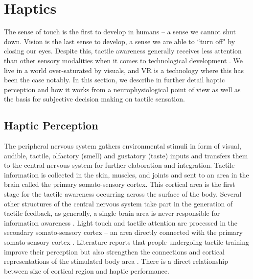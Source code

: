 \documentclass{article}
\begin{document}
\section{Haptics}\label{sec:haptics}
The sense of touch is the first to develop in humans -- a sense we cannot shut down. Vision is the last sense to develop, a sense we are able to ``turn off" \cite{Barnett1972} by closing our eyes. Despite this, tactile awareness generally receives less attention than other sensory modalities when it comes to technological development \cite{Gallace2012}. We live in a world over-saturated by visuals, and VR is a technology where this has been the case notably. %
In this section, we describe in further detail haptic perception and how it works from a neurophysiological point of view as well as the basis for subjective decision making on tactile sensation.

\subsection{Haptic Perception}
The peripheral nervous system gathers environmental stimuli in form of visual, audible, tactile, olfactory (smell) and gustatory (taste) inputs and transfers them to the central nervous system for further elaboration and integration. Tactile information is collected in the skin, muscles, and joints and sent to an area in the brain called the primary somato-sensory cortex\cite{Blatow2007}. This cortical area is the first stage for the tactile awareness occurring across the surface of the body. %
Several other structures of the central nervous system take part in the generation of tactile feedback, as generally, a single brain area is never responsible for information awareness \cite{Manzoni1986}. 
Light touch and tactile attention are processed in the secondary somato-sensory cortex -- an area directly connected with the primary somato-sensory cortex \cite{Eickhoff2005}. Literature reports that people undergoing tactile training improve their perception but also strengthen the connections and cortical representations of the stimulated body area \cite{Saito2007}. There is a direct relationship between size of cortical region and haptic performance. 
\end{document}
